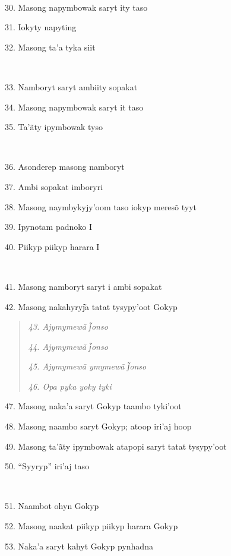 ~

30. Masong napymbowak saryt ity taso

31. Iokyty napyting

32. Masong ta'a tyka siit

~

33. Namboryt saryt ambiity sopakat

34. Masong napymbowak saryt it taso

35. Ta'ãty ipymbowak tyso

~

36. Asonderep masong namboryt

37. Ambi sopakat imboryri

38. Masong naymbykyjy'oom taso iokyp meresõ tyyt

39. Ipynotam padnoko I

40. Piikyp piikyp harara I

~

41. Masong namboryt saryt i ambi sopakat

42. Masong nakahyryj͂a tatat tysypy'oot Gokyp

\begin{quote}
\forceindent\emph{43. Ajymymewã j͂onso}

\emph{44. Ajymymewã j͂onso}

\emph{45. Ajymymewã ymymewã j͂onso}

\emph{46. Opa pyka yoky tyki}
\end{quote}

47. Masong naka'a saryt Gokyp taambo tyki'oot

48. Masong naambo saryt Gokyp; atoop iri'aj hoop

49. Masong ta'ãty ipymbowak atapopi saryt tatat tysypy'oot

50. ``Syyryp'' iri'aj taso

~

51. Naambot ohyn Gokyp

52. Masong naakat piikyp piikyp harara Gokyp

53. Naka'a saryt kahyt Gokyp pynhadna

\endgroup
